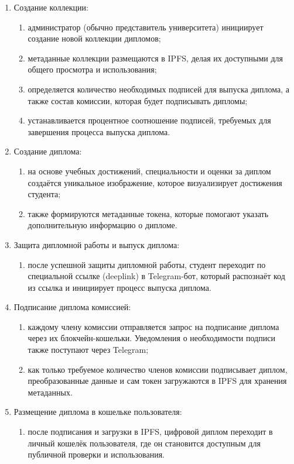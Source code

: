 \begin{enumerate}
    \item Создание коллекции:
    \begin{enumerate}
        \item администратор (обычно представитель университета) инициирует создание новой коллекции дипломов;
        \item метаданные коллекции размещаются в IPFS, делая их доступными для общего просмотра и использования;
        \item определяется количество необходимых подписей для выпуска диплома, а также состав комиссии, которая будет подписывать дипломы;
        \item устанавливается процентное соотношение подписей, требуемых для завершения процесса выпуска диплома.
    \end{enumerate}
    \item Создание диплома:
    \begin{enumerate}
        \item на основе учебных достижений, специальности и оценки за диплом создаётся уникальное изображение, которое визуализирует достижения студента;
        \item также формируются метаданные токена, которые помогают указать дополнительную информацию о дипломе.
    \end{enumerate}
    \item Защита дипломной работы и выпуск диплома:
    \begin{enumerate}
        \item после успешной защиты дипломной работы, студент переходит по специальной ссылке (deeplink) в Telegram-бот, который распознаёт код из ссылка и инициирует процесс выпуска диплома.
    \end{enumerate}
    \item Подписание диплома комиссией:
    \begin{enumerate}
        \item каждому члену комиссии отправляется запрос на подписание диплома через их блокчейн-кошельки. Уведомления о необходимости подписи также поступают через Telegram;
        \item как только требуемое количество членов комиссии подписывает диплом, преобразованные данные и сам токен загружаются в IPFS для хранения метаданных.
    \end{enumerate}
    \item Размещение диплома в кошельке пользователя:
    \begin{enumerate}
        \item после подписания и загрузки в IPFS, цифровой диплом переходит в личный кошелёк пользователя, где он становится доступным для публичной проверки и использования.
    \end{enumerate}
\end{enumerate}


